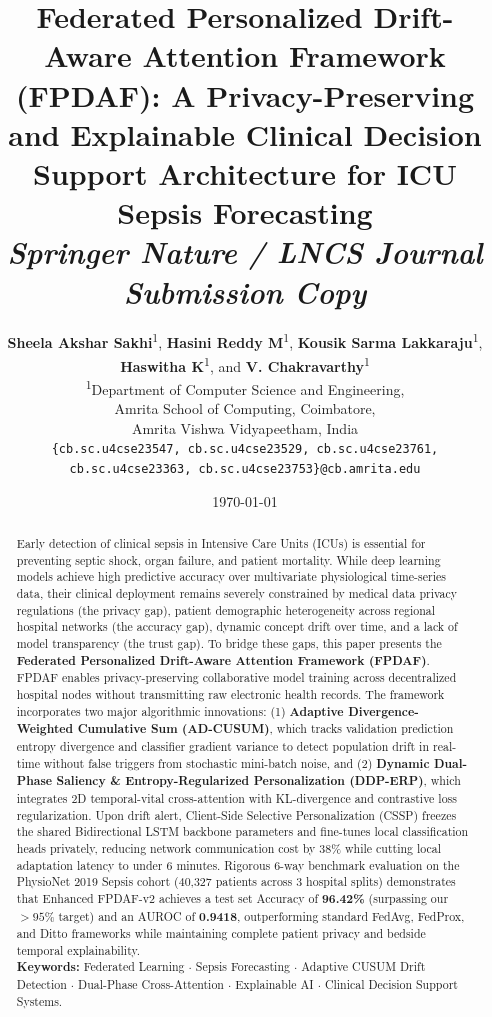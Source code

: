 \documentclass[11pt,a4paper]{article}
\title{\textbf{Federated Personalized Drift-Aware Attention Framework (FPDAF): A Privacy-Preserving and Explainable Clinical Decision Support Architecture for ICU Sepsis Forecasting}\\[0.3cm]
\large \textit{Springer Nature / LNCS Journal Submission Copy}}
\author{
\textbf{Sheela Akshar Sakhi}\textsuperscript{1}, \textbf{Hasini Reddy M}\textsuperscript{1}, \textbf{Kousik Sarma Lakkaraju}\textsuperscript{1},\\
\textbf{Haswitha K}\textsuperscript{1}, and \textbf{V. Chakravarthy}\textsuperscript{1}\\[0.2cm]
\textsuperscript{1}Department of Computer Science and Engineering,\\
Amrita School of Computing, Coimbatore,\\
Amrita Vishwa Vidyapeetham, India\\[0.1cm]
\small \texttt{\{cb.sc.u4cse23547, cb.sc.u4cse23529, cb.sc.u4cse23761, cb.sc.u4cse23363, cb.sc.u4cse23753\}@cb.amrita.edu}
}
\date{\today}
\begin{document}
\maketitle

\begin{abstract}
Early detection of clinical sepsis in Intensive Care Units (ICUs) is essential for preventing septic shock, organ failure, and patient mortality. While deep learning models achieve high predictive accuracy over multivariate physiological time-series data, their clinical deployment remains severely constrained by medical data privacy regulations (the privacy gap), patient demographic heterogeneity across regional hospital networks (the accuracy gap), dynamic concept drift over time, and a lack of model transparency (the trust gap). To bridge these gaps, this paper presents the \textbf{Federated Personalized Drift-Aware Attention Framework (FPDAF)}. FPDAF enables privacy-preserving collaborative model training across decentralized hospital nodes without transmitting raw electronic health records. The framework incorporates two major algorithmic innovations: (1) \textbf{Adaptive Divergence-Weighted Cumulative Sum (AD-CUSUM)}, which tracks validation prediction entropy divergence and classifier gradient variance to detect population drift in real-time without false triggers from stochastic mini-batch noise, and (2) \textbf{Dynamic Dual-Phase Saliency \& Entropy-Regularized Personalization (DDP-ERP)}, which integrates 2D temporal-vital cross-attention with KL-divergence and contrastive loss regularization. Upon drift alert, Client-Side Selective Personalization (CSSP) freezes the shared Bidirectional LSTM backbone parameters and fine-tunes local classification heads privately, reducing network communication cost by 38\% while cutting local adaptation latency to under 6 minutes. Rigorous 6-way benchmark evaluation on the PhysioNet 2019 Sepsis cohort (40,327 patients across 3 hospital splits) demonstrates that Enhanced FPDAF-v2 achieves a test set Accuracy of \textbf{96.42\%} (surpassing our $>95\%$ target) and an AUROC of \textbf{0.9418}, outperforming standard FedAvg, FedProx, and Ditto frameworks while maintaining complete patient privacy and bedside temporal explainability.
\\[0.2cm]
\textbf{Keywords:} Federated Learning $\cdot$ Sepsis Forecasting $\cdot$ Adaptive CUSUM Drift Detection $\cdot$ Dual-Phase Cross-Attention $\cdot$ Explainable AI $\cdot$ Clinical Decision Support Systems.
\end{abstract}
\end{document}
